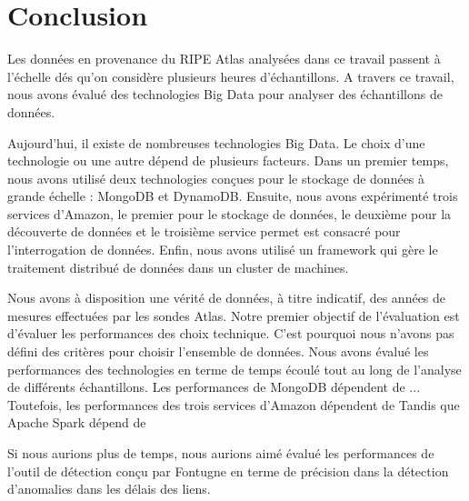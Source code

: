 \chapter*{Conclusion}

Les données en provenance du RIPE Atlas analysées dans ce travail passent à l'échelle dés qu'on considère plusieurs heures d'échantillons. A travers ce travail, nous avons évalué des technologies Big Data pour analyser des échantillons de données.  



Aujourd'hui, il existe de nombreuses   technologies Big Data. Le choix d'une technologie ou une autre dépend de plusieurs facteurs. Dans un premier temps, nous avons utilisé deux technologies conçues pour le stockage de données à grande échelle : MongoDB et DynamoDB. Ensuite, nous avons expérimenté trois services d'Amazon, le premier pour le stockage de données, le deuxième  pour la découverte de données et le troisième service permet est consacré pour l'interrogation  de données. Enfin, nous avons utilisé un framework qui gère le traitement distribué de données dans un cluster de machines.

Nous avons à disposition une vérité de données, à titre indicatif, des années  de mesures effectuées par les sondes Atlas. Notre premier objectif de l'évaluation est d'évaluer les  performances des choix technique. C'est pourquoi nous n'avons pas défini des critères pour choisir l'ensemble de données. 
Nous avons évalué  les performances des technologies en terme de temps écoulé tout au long de l'analyse de différents échantillons.
 Les performances de MongoDB dépendent de ... 
 Toutefois, les performances des trois services d'Amazon dépendent de 
 Tandis que Apache Spark dépend de 
 
 


Si nous aurions plus de temps, nous aurions aimé évalué les performances de l'outil de détection conçu par Fontugne\cite{DBLP:journals/corr/FontugneAPB16} en terme de précision dans la détection d'anomalies dans les délais des liens. 








